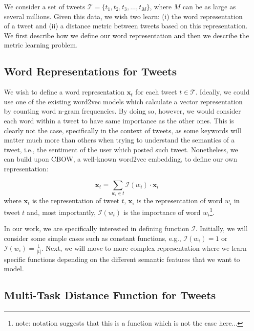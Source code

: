 \documentclass[letterpaper]{article}
\begin{document}
We consider a set of tweets $\mathcal{T} = \{ t_1, t_2, t_3, \dots, t_M \}$, where $M$ can be as large as several millions. Given this data, we wish two learn: (i) the word representation of a tweet and (ii) a distance metric between tweets based on this representation. We first describe how we define our word representation and then we describe the metric learning problem.

\subsection{Word Representations for Tweets}

We wish to define a word representation $\mathbf{x}_t$ for each tweet $t \in \mathcal{T}$. Ideally, we could use one of the existing word2vec models which calculate a vector representation by counting word n-gram frequencies. By doing so, however, we would consider each word within a tweet to have same importance as the other ones. This is clearly not the case, specifically in the context of tweets, as some keywords will matter much more than others when trying to understand the semantics of a tweet, i.e., the sentiment of the user which posted such tweet. Nonetheless, we can build upon CBOW, a well-known word2vec embedding, to define our own representation: 

\begin{equation}
\mathbf{x}_t  = \sum_{w_i \in t} \mathcal{I}(w_i) \cdot \mathbf{x}_i 
\label{eq:sum_of_words}
\end{equation}
where $\mathbf{x}_t$ is the representation of tweet $t$, $\mathbf{x}_i$ is the representation of word $w_i$ in tweet $t$ and, most importantly, $\mathcal{I}(w_i)$ is the importance of word $w_i$\footnote{note: notation suggests that this is a function which is not the case here...}.  

In our work, we are specifically interested in defining function $\mathcal{I}$. Initially, we will consider some simple cases such as constant functions, e.g., $\mathcal{I}(w_i) = 1$ or $\mathcal{I}(w_i) = \frac{1}{|t|}$. Next, we will move to more complex representation where we learn specific functions depending on the different semantic features that we want to model.  



\subsection{Multi-Task Distance Function for Tweets}
\end{document}
